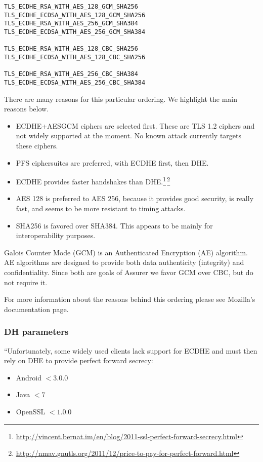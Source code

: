 \begin{verbatim}
TLS_ECDHE_RSA_WITH_AES_128_GCM_SHA256
TLS_ECDHE_ECDSA_WITH_AES_128_GCM_SHA256
TLS_ECDHE_RSA_WITH_AES_256_GCM_SHA384
TLS_ECDHE_ECDSA_WITH_AES_256_GCM_SHA384

TLS_ECDHE_RSA_WITH_AES_128_CBC_SHA256
TLS_ECDHE_ECDSA_WITH_AES_128_CBC_SHA256

TLS_ECDHE_RSA_WITH_AES_256_CBC_SHA384
TLS_ECDHE_ECDSA_WITH_AES_256_CBC_SHA384
\end{verbatim}

There are many reasons for this particular ordering. We highlight the main reasons below. 

\begin{itemize}
  \item ECDHE+AESGCM ciphers are selected first. These are TLS 1.2 ciphers and not widely supported at the moment. No known attack currently targets these ciphers.
  \item PFS ciphersuites are preferred, with ECDHE first, then DHE.
	\item ECDHE provides faster handshakes than DHE.\footnote{\url{http://vincent.bernat.im/en/blog/2011-ssl-perfect-forward-secrecy.html}}\,\footnote{\url{http://nmav.gnutls.org/2011/12/price-to-pay-for-perfect-forward.html}}
  \item AES 128 is preferred to AES 256, because it provides good security, is really fast, and seems to be more resistant to timing attacks.
  \item SHA256 is favored over SHA384. This appears to be mainly for interoperability purposes.
\end{itemize}

Galois Counter Mode (GCM) is an Authenticated Encryption (AE) algorithm. AE algorithms are designed to provide both data authenticity (integrity) and confidentiality. Since both are goals of Assurer we favor GCM over CBC, but do not require it.

For more information about the reasons behind this ordering please see Mozilla's documentation page.

\subsubsection{DH parameters}
``Unfortunately, some widely used clients lack support for ECDHE and must then rely on DHE to provide perfect forward secrecy:

\begin{itemize}
	\item Android $< 3.0.0$
  \item Java $< 7$
  \item OpenSSL $< 1.0.0$
\end{itemize}

